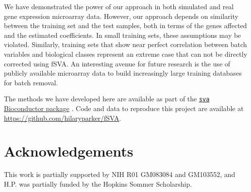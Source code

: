 \documentclass{bioinfo}\usepackage{graphicx, color}
\begin{document}
We have demonstrated the power of our approach in both simulated and real gene expression microarray data. However, our approach depends on similarity between the training set and the test samples, both in terms of the genes affected and the estimated coefficients. In small training sets, these assumptions may be violated. Similarly, training sets that show near perfect correlation between batch variables and biological classes represent an extreme case that can not be directly corrected using fSVA. An interesting avenue for future research is the use of publicly available microarray data to build increasingly large training databases for batch removal. 

The methods we have developed here are available as part of the \href{http://www.bioconductor.org/packages/2.11/bioc/html/sva.html}{\texttt{sva} Bioconductor package} \citep{Leek2012b}. Code and data to reproduce this project are available at \url{https://github.com/hilaryparker/fSVA}.

\section{Acknowledgements}
This work is partially supported by NIH R01 GM083084 and GM103552, and H.P. was partially funded by the Hopkins Sommer Scholarship.




\end{document}
